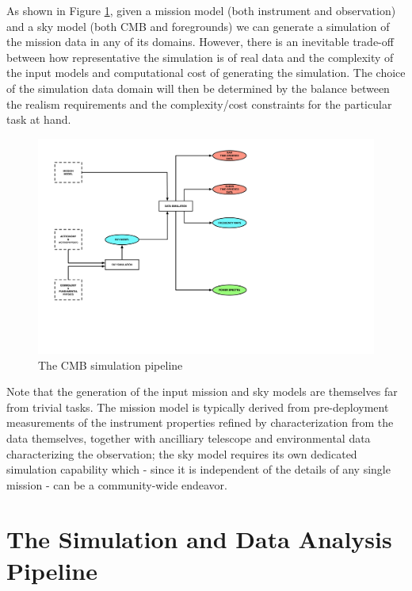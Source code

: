 As shown in Figure \ref{fig_sim}, given a mission model (both instrument and observation) and a sky model (both CMB and foregrounds) we can generate a simulation of the mission data in any of its domains. However, there is an inevitable trade-off between how representative the simulation is of real data and the complexity of the input models and computational cost of generating the simulation. The choice of the simulation data domain will then be determined by the balance between the realism requirements and the complexity/cost constraints for the particular task at hand.

\begin{figure}[htbp]
\centering
\includegraphics[width=1\textwidth]{Analysis/sim}
\caption{The CMB simulation pipeline}
\label{fig_sim}
\end{figure}

Note that the generation of the input mission and sky models are themselves far from trivial tasks. The mission model is typically derived from pre-deployment measurements of the instrument properties refined by characterization from the data themselves, together with ancilliary telescope and environmental data characterizing the observation; the sky model requires its own dedicated simulation capability which - since it is independent of the details of any single mission - can be a community-wide endeavor.

\newpage



\newpage



\newpage

\section{The Simulation and Data Analysis Pipeline}

